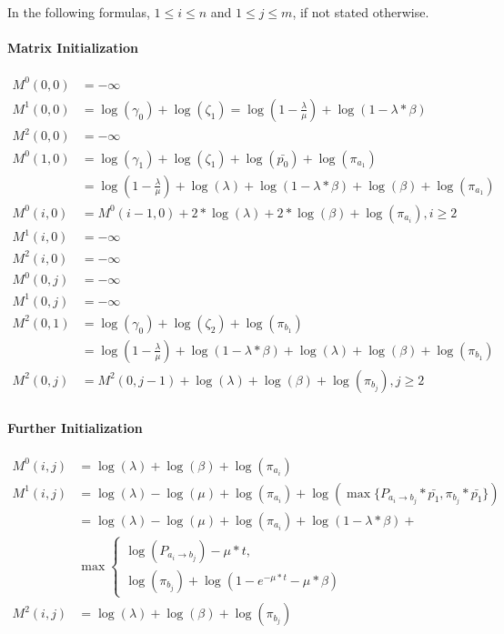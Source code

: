 \documentclass[runningheads,a4paper]{llncs}
\begin{document}
In the following formulas, $1 \leq i \leq n$ and $1 \leq j \leq m$, if not stated otherwise.

\paragraph{Matrix Initialization}
\label{sec:formulas:init}
\begin{align*}
M^0(0,0) &= -\infty \\
M^1(0,0) &= \log(\gamma_0) + \log(\zeta_1)
		= \log(1-\frac{\lambda}{\mu}) + \log (1 - \lambda * \beta) \\
M^2(0,0) &= -\infty \\
M^0(1,0) &= \log(\gamma_1) + \log(\zeta_1) + \log(\bar{p_0}) + \log(\pi_{a_1}) \\
		&= \log(1- \frac{\lambda}{\mu}) + \log(\lambda) + \log(1- \lambda *\beta) + \log(\beta) + \log(\pi_{a_1}) \\
M^0(i,0) &= M^0(i-1,0) + 2*\log(\lambda) + 2*\log(\beta) + \log(\pi_{a_i}), i \geq 2 \\
M^1(i,0) &= -\infty \\
M^2(i,0) &= -\infty \\
M^0(0,j) &= -\infty \\
M^1(0,j) &= -\infty \\
M^2(0,1) &= \log(\gamma_0) + \log(\zeta_2) + \log(\pi_{b_1}) \\
		&= \log(1- \frac{\lambda}{\mu}) + \log(1-\lambda*\beta) + \log(\lambda) + \log(\beta) + \log(\pi_{b_1}) \\
M^2(0,j) &= M^2(0, j-1) + \log(\lambda) + \log(\beta) + \log(\pi_{b_j}), j \geq 2 \\
\end{align*}


\paragraph{Further Initialization}
\label{sec:formulas:further}
\begin{align*}
M^0(i,j) &= \log(\lambda) + \log(\beta) + \log(\pi_{a_i}) \\
M^1(i,j) &= \log(\lambda) - \log(\mu) + \log(\pi_{a_i}) + \log(\max\{P_{a_i \to b_j} * \bar{p_1}, \pi_{b_j} * \bar{p_1}\}) \\
	&= \log(\lambda) - \log(\mu) + \log(\pi_{a_i}) + \log(1-\lambda * \beta) +\\ 
&\max \begin{cases}
	\log(P_{a_i \to b_j}) - \mu*t, \\
	\log(\pi_{b_j}) + \log(1- e^{- \mu*t} - \mu * \beta)
\end{cases} \\
M^2(i,j) &= \log(\lambda) + \log(\beta) + \log(\pi_{b_j})
\end{align*}
\end{document}
